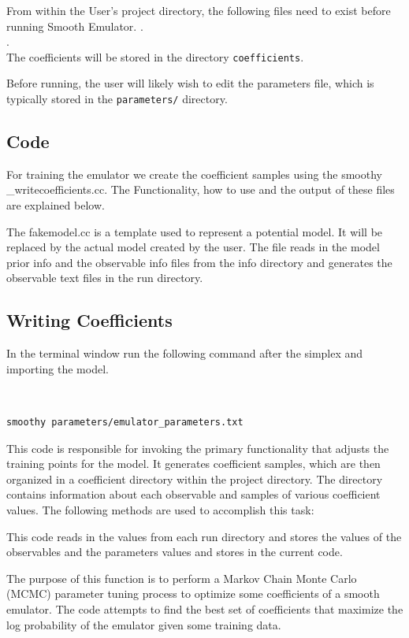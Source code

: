 \documentclass[12pt]{article}
\numberwithin{equation}{section}
\numberwithin{figure}{section}
\begin{document}
From within the User's project directory, the following files need to exist before running Smooth Emulator.
.\\
.\\
The coefficients will be stored in the directory {\tt coefficients}. 

Before running, the user will likely wish to edit the parameters file, which is typically stored in the {\tt parameters/} directory. 


\subsection{Code}

For training the emulator we create the coefficient samples using the smoothy
\_writecoefficients.cc. The Functionality, how to use and the output of these files are explained below.

The fakemodel.cc is a template used to represent a potential model. It will be replaced by the actual model created by the user. The file reads in the model prior info and the observable info files from the info directory and generates the observable text files in the run directory. 
 
\subsection{Writing Coefficients}

In the terminal window run the following command after the simplex and importing the model.

{\tt 
\begin{verbatim}
smoothy parameters/emulator_parameters.txt 
\end{verbatim}
}

This code is responsible for invoking the primary functionality that adjusts the training points for the model. It generates coefficient samples, which are then organized in a coefficient directory within the project directory. The directory contains information about each observable and samples of various coefficient values. The following methods are used to accomplish this task:

This code reads in the values from each run directory and stores the values of the observables and the parameters values and stores in the current code. 

The purpose of this function is to perform a Markov Chain Monte Carlo (MCMC) parameter tuning process to optimize some coefficients of a smooth emulator. The code attempts to find the best set of coefficients that maximize the log probability of the emulator given some training data. 
\end{document}
